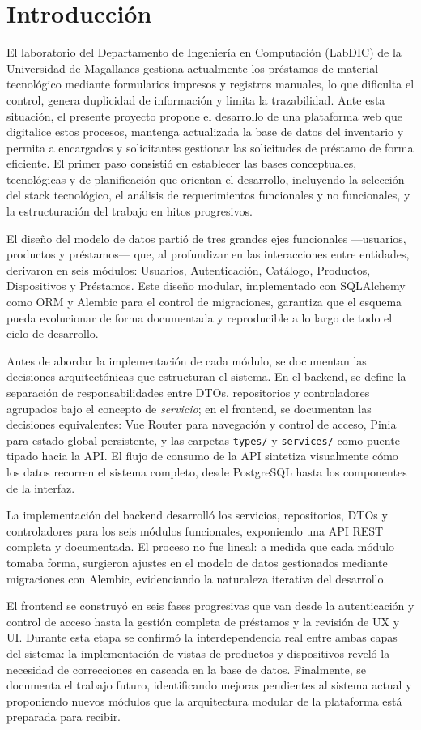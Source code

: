 \section{Introducción}\label{sec:intro_informe_final}

El laboratorio del Departamento de Ingeniería en Computación (LabDIC) de la Universidad de Magallanes gestiona actualmente los préstamos de material tecnológico mediante formularios impresos y registros manuales, lo que dificulta el control, genera duplicidad de información y limita la trazabilidad. Ante esta situación, el presente proyecto propone el desarrollo de una plataforma web que digitalice estos procesos, mantenga actualizada la base de datos del inventario y permita a encargados y solicitantes gestionar las solicitudes de préstamo de forma eficiente. El primer paso consistió en establecer las bases conceptuales, tecnológicas y de planificación que orientan el desarrollo, incluyendo la selección del stack tecnológico, el análisis de requerimientos funcionales y no funcionales, y la estructuración del trabajo en hitos progresivos.

El diseño del modelo de datos partió de tres grandes ejes funcionales ---usuarios, productos y préstamos--- que, al profundizar en las interacciones entre entidades, derivaron en seis módulos: Usuarios, Autenticación, Catálogo, Productos, Dispositivos y Préstamos. Este diseño modular, implementado con SQLAlchemy como ORM y Alembic para el control de migraciones, garantiza que el esquema pueda evolucionar de forma documentada y reproducible a lo largo de todo el ciclo de desarrollo.

Antes de abordar la implementación de cada módulo, se documentan las decisiones arquitectónicas que estructuran el sistema. En el backend, se define la separación de responsabilidades entre DTOs, repositorios y controladores agrupados bajo el concepto de \textit{servicio}; en el frontend, se documentan las decisiones equivalentes: Vue Router para navegación y control de acceso, Pinia para estado global persistente, y las carpetas \texttt{types/} y \texttt{services/} como puente tipado hacia la API. El flujo de consumo de la API sintetiza visualmente cómo los datos recorren el sistema completo, desde PostgreSQL hasta los componentes de la interfaz.

La implementación del backend desarrolló los servicios, repositorios, DTOs y controladores para los seis módulos funcionales, exponiendo una API REST completa y documentada. El proceso no fue lineal: a medida que cada módulo tomaba forma, surgieron ajustes en el modelo de datos gestionados mediante migraciones con Alembic, evidenciando la naturaleza iterativa del desarrollo.

El frontend se construyó en seis fases progresivas que van desde la autenticación y control de acceso hasta la gestión completa de préstamos y la revisión de UX y UI. Durante esta etapa se confirmó la interdependencia real entre ambas capas del sistema: la implementación de vistas de productos y dispositivos reveló la necesidad de correcciones en cascada en la base de datos. Finalmente, se documenta el trabajo futuro, identificando mejoras pendientes al sistema actual y proponiendo nuevos módulos que la arquitectura modular de la plataforma está preparada para recibir.